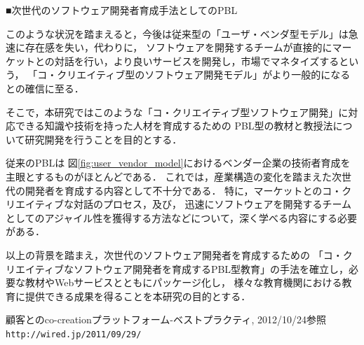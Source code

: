 \documentclass[11pt,a4paper,twoside]{jarticle}
\newcommand{\研究種別}{A}	%
\newcommand{\研究課題名}{コ・クリエイティブなソフトウェア開発者を育成するPBL型教育}
\newcommand{\研究機関名}{産業技術大学院大学}
\newcommand{\研究代表者氏名}{中鉢　欣秀}
\newcommand{\研究代表者氏名ふりがな}{ちゅうばち　よしひで}
\newcommand{\本応募effort}{\KLEffort{18}}	%
\newcommand{\研究期間の最終元号年度}{27}	%
\begin{document}
{	\begin{flushleft}
		■次世代のソフトウェア開発者育成手法としてのPBL
	\end{flushleft}

    このような状況を踏まえると，今後は従来型の「ユーザ・ベンダ型モデル」は急速に存在感を失い，代わりに，
    ソフトウェアを開発するチームが直接的にマーケットとの対話を行い，より良いサービスを開発し，市場でマネタイズするという，
    「コ・クリエイティブ型のソフトウェア開発モデル」がより一般的になるとの確信に至る．
    
    そこで，本研究ではこのような「コ・クリエイティブ型ソフトウェア開発」に対応できる知識や技術を持った人材を育成するための
    PBL型の教材と教授法について研究開発を行うことを目的とする．
    
    従来のPBLは
    図\ref{fig:user_vendor_model}におけるベンダー企業の技術者育成を主眼とするものがほとんどである．
    これでは，産業構造の変化を踏まえた次世代の開発者を育成する内容として不十分である．
    特に，マーケットとのコ・クリエイティブな対話のプロセス，及び，
    迅速にソフトウェアを開発するチームとしてのアジャイル性を獲得する方法などについて，深く学べる内容にする必要がある．
    
    以上の背景を踏まえ，次世代のソフトウェア開発者を育成するための
    「コ・クリエイティブなソフトウェア開発者を育成するPBL型教育」の手法を確立し，必要な教材やWebサービスとともにパッケージ化し，
    様々な教育機関における教育に提供できる成果を得ることを本研究の目的とする．
    
    
	\vspace{1cm}
	\begin{thebibliography}{99}
		 顧客とのco-creationプラットフォーム-ベストプラクティ, 2012/10/24参照 \\
                        \tt{http://wired.jp/2011/09/29/}
	\end{thebibliography}
}

\end{document}
